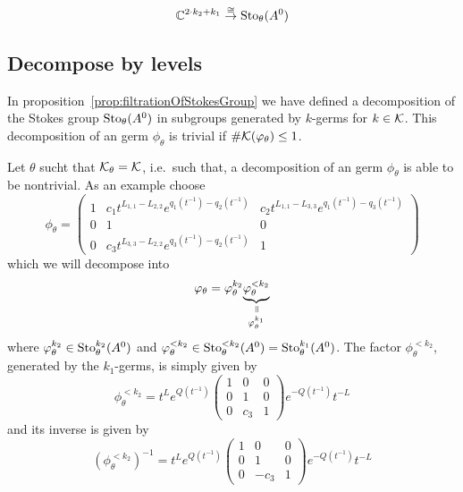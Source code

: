\begin{prop}
  \TODO{}
  \[
    \mathbb{C}^{2\cdot k_2 + k_1}
    \overset\cong\to
    \operatorname{Sto}_\theta(A^0)
  \]
\end{prop}

\subsection{Decompose by levels}
In proposition~\ref{prop:filtrationOfStokesGroup} we have defined a
decomposition of the Stokes group $\operatorname{Sto}_\theta(A^0)$ in subgroups generated by
$k$-germs for $k\in\mathcal{K}$.
This decomposition of an germ $\phi_\theta$ is trivial if
$\#\mathcal{K}(\varphi_\theta)\leq1$.

Let $\theta$ sucht that $\mathcal{K}_{\theta}=\mathcal{K}$, i.e.\ such that, a decomposition of
an germ $\phi_\theta$ is able to be nontrivial.
As an example choose
\[
  \phi_\theta=\begin{pmatrix}
    1
    & c_1 t^{L_{1,1}-L_{2,2}}e^{q_1(t^{-1})-q_2(t^{-1})}
    & c_2 t^{L_{1,1}-L_{3,3}}e^{q_1(t^{-1})-q_3(t^{-1})}
    \\0     & 1     & 0
    \\0
    & c_3 t^{L_{3,3}-L_{2,2}}e^{q_3(t^{-1})-q_2(t^{-1})}
    & 1
  \end{pmatrix}
\]
which we will decompose into
\[
  \phi_\theta=\phi_\theta^{k_2}
  \underset{\phi_\theta^{k_1}}{%
    \underset{\text{\rotatebox[origin=c]{-90}{$=$}}}{%
      \underbrace{\phi_\theta^{<k_2}}}}
\]
where $\varphi_\theta^{k_2}\in\operatorname{Sto}_\theta^{k_2}(A^0)$ and 
$\varphi_\theta^{<k_2}\in\operatorname{Sto}_\theta^{<k_2}(A^0)=\operatorname{Sto}_\theta^{k_1}(A^0)$.
The factor $\phi_\theta^{<k_2}$, generated by the $k_1$-germs, is simply given
by 
\[
  \phi_\theta^{<k_2}=
  t^{L}e^{Q(t^{-1})}
  \begin{pmatrix}
    1 & 0 & 0
  \\0 & 1 & 0
  \\0 & c_3 & 1
  \end{pmatrix}
  e^{-Q(t^{-1})}t^{-L}
\]
and its inverse is given by
\[
  \left(\phi_\theta^{<k_2}\right)^{-1}=
  t^{L}e^{Q(t^{-1})}
  \begin{pmatrix}
    1 & 0 & 0
  \\0 & 1 & 0
  \\0 & -c_3 & 1
  \end{pmatrix}
  e^{-Q(t^{-1})}t^{-L}
\]
